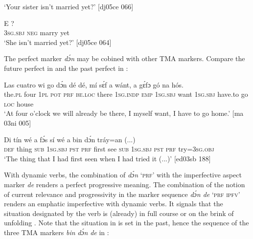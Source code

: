 \glt ‘Your sister isn’t married yet?’ [dj05ce 066]
\z


\ea%
    \label{ex:key:399}
    \gll E        ?\\
\textsc{3sg.sbj}  \textsc{neg}  marry  yet\\

\glt ‘She isn’t married yet?’ [dj05ce 064]
\z

The perfect marker \textit{dɔ́n} may be cobined with other TMA markers. Compare the future perfect in  and the past perfect in : 


\ea%
    \label{ex:key:400}
    \gll Las    cuatro  wi  go  dɔ́n  dé    dé,    mí    sɛ́f  a    wánt,
a    gɛ́fɔ    gó  na  hós.\\
the\textsc{.pl}  four    \textsc{1pl}  \textsc{pot}  \textsc{prf}  \textsc{be.loc}  there  \textsc{1sg.indp}  \textsc{emp}  \textsc{1sg.sbj}  want
\textsc{1sg.sbj}  have.to  go  \textsc{loc}  house\\

\glt ‘At four o’clock we will already be there, I myself want, I have to go home.’ [ma 03ni 005]
\z


\ea%
    \label{ex:key:401}
    \gll Di  tín    wé  a        fɔ́s  sí  wé  a    bin
dɔ́n    tráy=an  (...)\\
\textsc{def}  thing  \textsc{sub}  \textsc{1sg.sbj}  \textsc{pst}  \textsc{prf}  first  see  \textsc{sub}  \textsc{1sg.sbj}  \textsc{pst}
\textsc{prf}    try=\textsc{3sg.obj}\\

\glt ‘The thing that I had first seen when I had tried it (...)’ [ed03sb 188]
\z

With dynamic verbs, the combination of \textit{dɔ́n} ‘\textsc{prf}’ with the imperfective aspect marker \textit{de} renders a perfect progressive meaning. The combination of the notion of current relevance and progressivity in the marker sequence \textit{dɔ́n de} \textsc{‘prf} \textsc{ipfv’} renders an emphatic imperfective with dynamic verbs. It signals that the situation designated by the verb is (already) in full course  or on the brink of unfolding . Note that the situation in  is set in the past, hence the sequence of the three TMA markers \textit{bin} \textit{dɔ́n} \textit{de} in :


